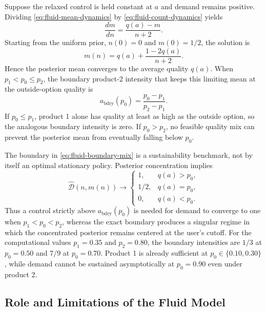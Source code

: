 \documentclass[opre]{informs3}
\begin{document}
Suppose the relaxed control is held constant at $a$ and demand remains positive.
Dividing \cref{eq:fluid-mean-dynamics} by \cref{eq:fluid-count-dynamics} yields
\begin{equation}
    \frac{dm}{dn}=\frac{q(a)-m}{n+2}.
    \label{eq:fluid-mean-by-count}
\end{equation}
Starting from the uniform prior, $n(0)=0$ and $m(0)=1/2$, the solution is
\begin{equation}
    m(n)
    =
    q(a)+\frac{1-2q(a)}{n+2}.
    \label{eq:fluid-mean-solution}
\end{equation}
Hence the posterior mean converges to the average quality $q(a)$. When
$p_1<p_0\leq p_2$, the boundary product-2 intensity that keeps this limiting
mean at the outside-option quality is
\begin{equation}
    a_{\mathrm{bdry}}(p_0)
    =
    \frac{p_0-p_1}{p_2-p_1}.
    \label{eq:fluid-boundary-mix}
\end{equation}
If $p_0\leq p_1$, product 1 alone has quality at least as high as the outside
option, so the analogous boundary intensity is zero. If $p_0>p_2$, no feasible
quality mix can prevent the posterior mean from eventually falling below
$p_0$.

The boundary in \cref{eq:fluid-boundary-mix} is a sustainability benchmark, not
by itself an optimal stationary policy. Posterior concentration implies
\begin{equation}
    \widehat{\mathcal{D}}(n,m(n))
    \longrightarrow
    \begin{cases}
        1, & q(a)>p_0,\\
        1/2, & q(a)=p_0,\\
        0, & q(a)<p_0.
    \end{cases}
    \label{eq:fluid-demand-limit}
\end{equation}
Thus a control strictly above $a_{\mathrm{bdry}}(p_0)$ is needed for demand to
converge to one when $p_1<p_0<p_2$, whereas the exact boundary produces a
singular regime in which the concentrated posterior remains centered at the
user's cutoff. For the computational values $p_1=0.35$ and $p_2=0.80$, the
boundary intensities are $1/3$ at $p_0=0.50$ and $7/9$ at $p_0=0.70$.
Product 1 is already sufficient at $p_0\in\{0.10,0.30\}$, while demand cannot
be sustained asymptotically at $p_0=0.90$ even under product 2.

\subsection{Role and Limitations of the Fluid Model}
\end{document}
